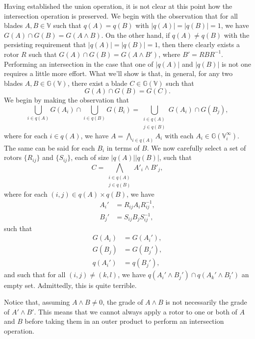 \documentclass{birkjour}
\theoremstyle{definition}
\theoremstyle{remark}
\numberwithin{equation}{section}
\newcommand{\G}{\mathbb{G}}
\newcommand{\V}{\mathbb{V}}
\begin{document}
Having established the union operation, it is not clear at this point how
the intersection operation is preserved.  We begin with the observation
that for all blades $A,B\in\V$ such that $q(A)=q(B)$ with $|q(A)|=|q(B)|=1$, we have
$G(A)\cap G(B)=G(A\wedge B)$.  On the other hand, if $q(A)\neq q(B)$ with
the persisting requirement that $|q(A)|=|q(B)|=1$,
then there clearly exists a rotor $R$ such that $G(A)\cap G(B)=G(A\wedge B')$,
where $B'=RBR^{-1}$.  Performing an intersection in the case that one of $|q(A)|$
and $|q(B)|$ is not one requires a little more effort.  What we'll show is that,
in general, for any two blades $A,B\in\G(\V)$, there exist a blade $C\in\G(\V)$
such that
\begin{equation}
G(A)\cap G(B)=G(C).
\end{equation}
We begin by making the observation that
\begin{equation}
\bigcup_{i\in q(A)}G(A_i)\cap\bigcup_{i\in q(B)}G(B_i) =
\bigcup_{\substack{i\in q(A)\\j\in q(B)}} G(A_i)\cap G(B_j),
\end{equation}
where for each $i\in q(A)$, we have $A=\bigwedge_{i\in q(A)}A_i$ with
each $A_i\in\G(\V_i^\infty)$.  The same can be
said for each $B_i$ in terms of $B$.  We now carefully select
a set of rotors $\{R_{ij}\}$ and $\{S_{ij}\}$, each of size $|q(A)||q(B)|$, such that
\begin{equation}
C=\bigwedge_{\substack{i\in q(A)\\j\in q(B)}}A'_i\wedge B'_j,
\end{equation}
where for each $(i,j)\in q(A)\times q(B)$, we have
\begin{align}
A_i' &= R_{ij}A_iR_{ij}^{-1}, \\
B_j' &= S_{ij}B_jS_{ij}^{-1},
\end{align}
such that
\begin{align}
G(A_i)&=G(A_i'), \\
G(B_j)&=G(B_j'), \\
q(A_i')&=q(B_j'),
\end{align}
and such that for all $(i,j)\neq(k,l)$, we have
$q(A_i'\wedge B_j')\cap q(A_k'\wedge B_l')$ an empty set.
Admittedly, this is quite terrible.

Notice that, assuming $A\wedge B\neq 0$, the grade of $A\wedge B$ is
not necessarily the grade of $A'\wedge B'$.  This means that we cannot
always apply a rotor to one or both of $A$ and $B$ before taking them
in an outer product to perform an intersection operation.
\end{document}
